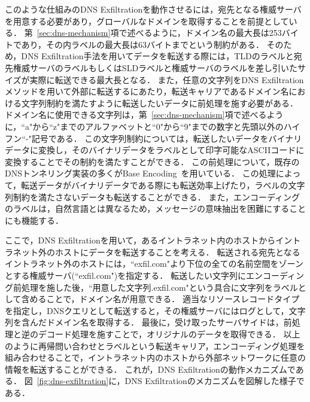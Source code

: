 このような仕組みのDNS Exfiltrationを動作させるには，宛先となる権威サーバを用意する必要があり，グローバルなドメインを取得することを前提としている．
第~\ref{sec:dns-mechanism}項で述べるように，ドメイン名の最大長は253バイトであり，その内ラベルの最大長は63バイトまでという制約がある．
そのため，DNS Exfiltration手法を用いてデータを転送する際には，TLDのラベルと宛先権威サーバのラベルもしくはSLDラベルと権威サーバのラベルを差し引いたサイズが実際に転送できる最大長となる．
また，任意の文字列をDNS Exfiltrationメソッドを用いて外部に転送するにあたり，転送キャリアであるドメイン名における文字列制約を満たすように転送したいデータに前処理を施す必要がある．
ドメイン名に使用できる文字列は，第~\ref{sec:dns-mechanism}項で述べるように，``a"から``z"までのアルファベットと``0"から``9"までの数字と先頭以外のハイフン``-"記号である．
この文字列制約については，転送したいデータをバイナリデータに変換し，そのバイナリデータをラベルとして印字可能なASCIIコードに変換することでその制約を満たすことができる．
この前処理について，既存のDNSトンネリング実装の多くがBase Encoding~\cite{rfc4648}を用いている．
この処理によって，転送データがバイナリデータである際にも転送効率上げたり，ラベルの文字列制約を満たさないデータも転送することができる．
また，エンコーディングのラベルは，自然言語とは異なるため，メッセージの意味抽出を困難にすることにも機能する．

ここで，DNS Exfiltrationを用いて，あるイントラネット内のホストからイントラネット外のホストにデータを転送することを考える．
転送される宛先となるイントラネット外のホストには，``exfil.com"より下位の全ての名前空間をゾーンとする権威サーバ(``exfil.com")を指定する．
転送したい文字列にエンコーディング前処理を施した後，``用意した文字列.exfil.com"という具合に文字列をラベルとして含めることで，ドメイン名が用意できる．
適当なリソースレコードタイプを指定し，DNSクエリとして転送すると，その権威サーバにはログとして，文字列を含んだドメイン名を取得する．
最後に，受け取ったサーバサイドは，前処理と逆のデコード処理を施すことで，オリジナルのデータを取得できる．
以上のように再帰問い合わせとラベルという転送キャリア，エンコーディング処理を組み合わせることで，イントラネット内のホストから外部ネットワークに任意の情報を転送することができる．
これが，DNS Exfiltrationの動作メカニズムである．
図~\ref{fig:dns-exfiltration}に，DNS Exfiltrationのメカニズムを図解した様子である．




